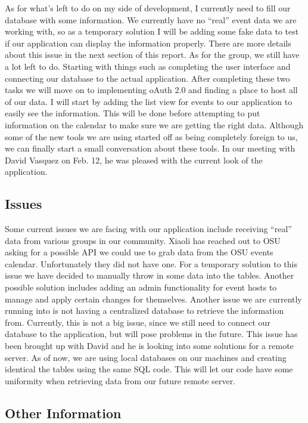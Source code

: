 \documentclass[letterpaper, 10pt,titlepage]{article}
\begin{document}
As for what’s left to do on my side of development, I currently need to fill our database with some information. We currently have no “real” event data we are working with, so as a temporary solution I will be adding some fake data to test if our application can display the information properly. There are more details about this issue in the next section of this report. As for the group, we still have a lot left to do. Starting with things such as completing the user interface and connecting our database to the actual application. After completing these two tasks we will move on to implementing oAuth 2.0 and finding a place to host all of our data. I will start by adding the list view for events to our application to easily see the information. This will be done before attempting to put information on the calendar to make sure we are getting the right data. Although some of the new tools we are using started off as being completely foreign to us, we can finally start a small conversation about these tools. In our meeting with David Vasquez on Feb. 12, he was pleased with the current look of the application.

\subsection{Issues}

Some current issues we are facing with our application include receiving “real” data from various groups in our community. Xiaoli has reached out to OSU asking for a possible API we could use to grab data from the OSU events calendar. Unfortunately they did not have one. For a temporary solution to this issue we have decided to manually throw in some data into the tables. Another possible solution includes adding an admin functionality for event hosts to manage and apply certain changes for themselves. Another issue we are currently running into is not having a centralized database to retrieve the information from. Currently, this is not a big issue, since we still need to connect our database to the application, but will pose problems in the future. This issue has been brought up with David and he is looking into some solutions for a remote server. As of now, we are using local databases on our machines and creating identical the tables using the same SQL code. This will let our code have some uniformity when retrieving data from our future remote server.

\subsection{Other Information}
\end{document}
